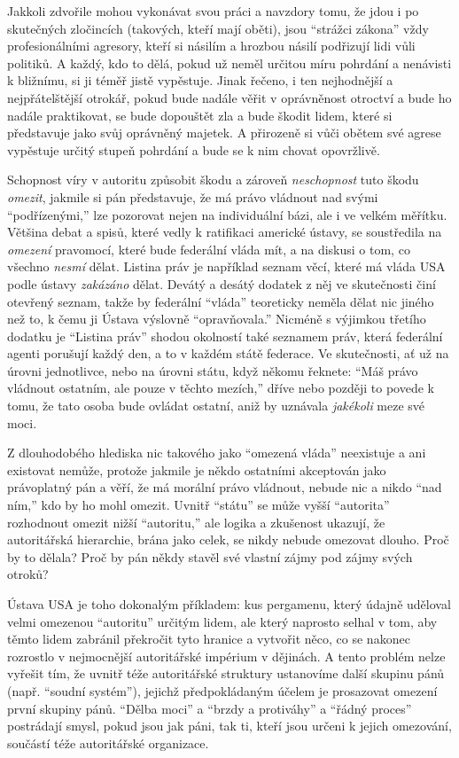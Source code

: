 \documentclass{book}
\begin{document}
Jakkoli zdvořile mohou vykonávat svou práci a navzdory tomu, že jdou i po skutečných zločincích (takových, kteří mají oběti), jsou \enquote{strážci zákona} vždy profesionálními agresory, kteří si násilím a hrozbou násilí podřizují lidi vůli politiků. A každý, kdo to dělá, pokud už neměl určitou míru pohrdání a nenávisti k bližnímu, si ji téměř jistě vypěstuje. Jinak řečeno, i ten nejhodnější a nejpřátelštější otrokář, pokud bude nadále věřit v oprávněnost otroctví a bude ho nadále praktikovat, se bude dopouštět zla a bude škodit lidem, které si představuje jako svůj oprávněný majetek. A přirozeně si vůči obětem své agrese vypěstuje určitý stupeň pohrdání a bude se k nim chovat opovržlivě.

Schopnost víry v autoritu způsobit škodu a zároveň \emph{neschopnost} tuto škodu \emph{omezit}, jakmile si pán představuje, že má právo vládnout nad svými \enquote{podřízenými,} lze pozorovat nejen na individuální bázi, ale i ve velkém měřítku. Většina debat a spisů, které vedly k ratifikaci americké ústavy, se soustředila na \emph{omezení} pravomocí, které bude federální vláda mít, a na diskusi o tom, co všechno \emph{nesmí} dělat. Listina práv je například seznam věcí, které má vláda USA podle ústavy \emph{zakázáno} dělat. Devátý a desátý dodatek z něj ve skutečnosti činí otevřený seznam, takže by federální \enquote{vláda} teoreticky neměla dělat nic jiného než to, k čemu ji Ústava výslovně \enquote{opravňovala.} Nicméně s výjimkou třetího dodatku je \enquote{Listina práv} shodou okolností také seznamem práv, která federální agenti porušují každý den, a to v každém státě federace. Ve skutečnosti, ať už na úrovni jednotlivce, nebo na úrovni státu, když někomu řeknete: \enquote{Máš právo vládnout ostatním, ale pouze v těchto mezích,} dříve nebo později to povede k tomu, že tato osoba bude ovládat ostatní, aniž by uznávala \emph{jakékoli} meze své moci.

Z dlouhodobého hlediska nic takového jako \enquote{omezená vláda} neexistuje a ani existovat nemůže, protože jakmile je někdo ostatními akceptován jako právoplatný pán a věří, že má morální právo vládnout, nebude nic a nikdo \enquote{nad ním,} kdo by ho mohl omezit. Uvnitř \enquote{státu} se může vyšší \enquote{autorita} rozhodnout omezit nižší \enquote{autoritu,} ale logika a zkušenost ukazují, že autoritářská hierarchie, brána jako celek, se nikdy nebude omezovat dlouho. Proč by to dělala? Proč by pán někdy stavěl své vlastní zájmy pod zájmy svých otroků?

Ústava USA je toho dokonalým příkladem: kus pergamenu, který údajně uděloval velmi omezenou \enquote{autoritu} určitým lidem, ale který naprosto selhal v tom, aby těmto lidem zabránil překročit tyto hranice a vytvořit něco, co se nakonec rozrostlo v nejmocnější autoritářské impérium v dějinách. A tento problém nelze vyřešit tím, že uvnitř téže autoritářské struktury ustanovíme další skupinu pánů (např. \enquote{soudní systém}), jejichž předpokládaným účelem je prosazovat omezení první skupiny pánů. \enquote{Dělba moci} a \enquote{brzdy a protiváhy} a \enquote{řádný proces} postrádají smysl, pokud jsou jak páni, tak ti, kteří jsou určeni k jejich omezování, součástí téže autoritářské organizace.
\end{document}
